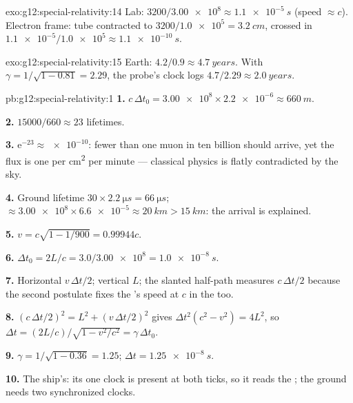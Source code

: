 \begin{solution}{exo:g12:special-relativity:14}
Lab: $3200/\num{3.00e8} \approx \qty{1.1e-5}{s}$ (speed
$\approx c$). Electron frame: tube contracted to
$3200/\num{1.0e5} = \qty{3.2}{cm}$, crossed in
$\num{1.1e-5}/\num{1.0e5} \approx \qty{1.1e-10}{s}$.
\end{solution}

\begin{solution}{exo:g12:special-relativity:15}
Earth: $4.2/0.9 \approx \qty{4.7}{years}$. With
$\gamma = 1/\sqrt{1 - 0.81} = 2.29$, the probe's clock logs
$4.7/2.29 \approx \qty{2.0}{years}$.
\end{solution}

\begin{solution}{pb:g12:special-relativity:1}
\textbf{1.} $c\,\Delta t_0 = \num{3.00e8} \times \num{2.2e-6} \approx
\qty{660}{m}$.

\textbf{2.} $\num{15000}/660 \approx 23$ lifetimes.

\textbf{3.} $\mathrm{e}^{-23} \approx \num{e-10}$: fewer than one muon
in ten billion should arrive, yet the flux is one per \unit{cm^2} per
minute --- classical physics is flatly contradicted by the sky.

\textbf{4.} Ground lifetime $30 \times \qty{2.2}{\micro s} =
\qty{66}{\micro s}$;  $\approx \num{3.00e8} \times \num{6.6e-5}
\approx \qty{20}{km} > \qty{15}{km}$: the arrival is explained.

\textbf{5.} $v = c\sqrt{1 - 1/900} = 0.99944c$.

\textbf{6.} $\Delta t_0 = 2L/c = 3.0/\num{3.00e8} = \qty{1.0e-8}{s}$.

\textbf{7.} Horizontal $v\,\Delta t/2$; vertical $L$; the slanted
half-path measures $c\,\Delta t/2$ because the second postulate fixes
the 's speed at $c$ in the  too.

\textbf{8.} $(c\,\Delta t/2)^2 = L^2 + (v\,\Delta t/2)^2$ gives
$\Delta t^2(c^2 - v^2) = 4L^2$, so $\Delta t =
(2L/c)/\sqrt{1 - v^2/c^2} = \gamma\,\Delta t_0$.

\textbf{9.} $\gamma = 1/\sqrt{1 - 0.36} = 1.25$;
$\Delta t = \qty{1.25e-8}{s}$.

\textbf{10.} The ship's: its one clock is present at both ticks, so it
reads the ; the ground needs two synchronized clocks.


\end{solution}
